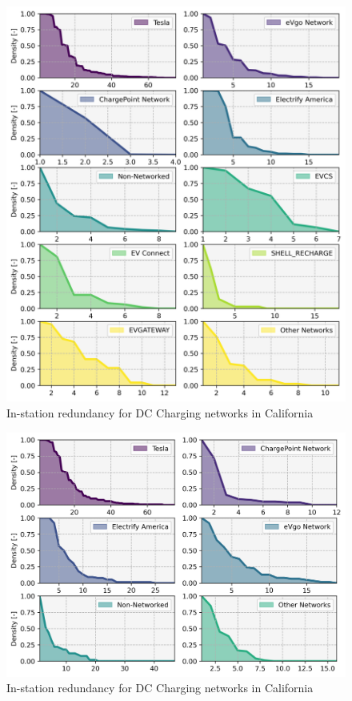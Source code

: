\appendix

\begin{figure}[H]
	\centering
	\includegraphics[width = \linewidth]{figs/California_RIS_SF_All.png}
	\caption{In-station redundancy for DC Charging networks in California}
	\label{fig:ris_top_networks}
\end{figure}

\begin{figure}[H]
	\centering
	\includegraphics[width = \linewidth]{figs/California_RIS_SF_Corridor.png}
	\caption{In-station redundancy for DC Charging networks in California}
	\label{fig:ris_top_networks_corridor}
\end{figure}


